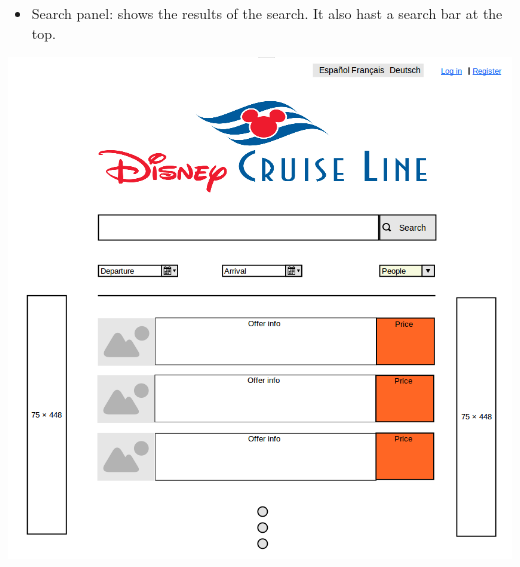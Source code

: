 \documentclass[11pt]{article}
\begin{document}
	\begin{qn}
		\begin{itemize}
			\item Search panel: shows the results of the search. It also hast a search bar at the top.
		\end{itemize}
		\begin{center}
			\begin{minipage}{0.5\linewidth}
				\includegraphics[width=\linewidth]{images/mockup2.png}
				\label{fig:mockup2}
			\end{minipage}
		\end{center}
	\end{qn}
\end{document}
